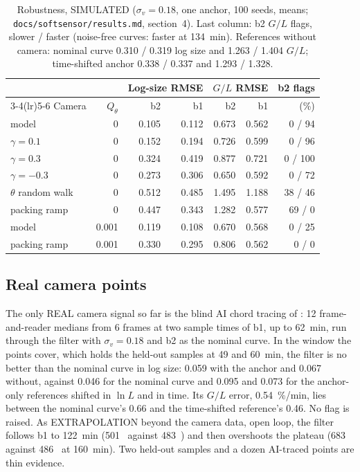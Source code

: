 \begin{table}
\centering\tabfont\setlength{\tabcolsep}{2.5pt}
\caption{Robustness, SIMULATED ($\sigma_v = 0.18$, one anchor, 100 seeds, means; \texttt{docs/softsensor/results.md},
section~4). Last column: b2 $G/L$ flags, slower / faster (noise-free curves: faster at 134~min). References without
camera: nominal curve 0.310 / 0.319 log size and 1.263 / 1.404 $G/L$; time-shifted anchor 0.338 / 0.337 and
1.293 / 1.328.}\label{tab:robust}
\begin{tabular}{@{}lrrrrrr@{}}
\toprule
 & & \multicolumn{2}{c}{Log-size RMSE} & \multicolumn{2}{c}{$G/L$ RMSE} & b2 flags \\
\cmidrule(lr){3-4}\cmidrule(lr){5-6}
Camera & $Q_\theta$ & b2 & b1 & b2 & b1 & (\%) \\
\midrule
model & 0 & 0.105 & 0.112 & 0.673 & 0.562 & 0 / 94 \\
$\gamma = 0.1$ & 0 & 0.152 & 0.194 & 0.726 & 0.599 & 0 / 96 \\
$\gamma = 0.3$ & 0 & 0.324 & 0.419 & 0.877 & 0.721 & 0 / 100 \\
$\gamma = -0.3$ & 0 & 0.273 & 0.306 & 0.650 & 0.592 & 0 / 72 \\
$\theta$ random walk & 0 & 0.512 & 0.485 & 1.495 & 1.188 & 38 / 46 \\
packing ramp & 0 & 0.447 & 0.343 & 1.282 & 0.577 & 69 / 0 \\
model & 0.001 & 0.119 & 0.108 & 0.670 & 0.568 & 0 / 25 \\
packing ramp & 0.001 & 0.330 & 0.295 & 0.806 & 0.562 & 0 / 0 \\
\bottomrule
\end{tabular}
\end{table}

\subsection{Real camera points}\label{sec:res-signal}

The only REAL camera signal so far is the blind AI chord tracing of : 12 frame-and-reader medians
from 6 frames at two sample times of b1, up to 62~min, run through the filter with $\sigma_v = 0.18$ and b2 as the
nominal curve. In the window the points cover, which holds the held-out samples at 49 and 60~min, the filter is no
better than the nominal curve in log size: 0.059 with the anchor and 0.067 without, against 0.046 for the nominal curve
and 0.095 and 0.073 for the anchor-only references shifted in $\ln L$ and in time. Its $G/L$ error, 0.54~\%/min, lies
between the nominal curve's 0.66 and the time-shifted reference's 0.46. No flag is raised. As EXTRAPOLATION beyond the
camera data, open loop, the filter follows b1 to 122~min (501~\um{} against 483~\um) and then overshoots the plateau
(683~\um{} against 486~\um{} at 160~min). Two held-out samples and a dozen AI-traced points are thin evidence.

